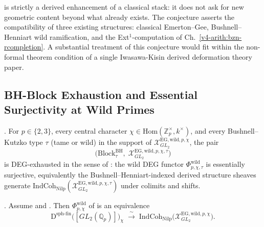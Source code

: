 \begin{remark}
\label{v4-arith:deg-f1a:rem:wild-EG-domain}
 is strictly a
derived enhancement of a classical stack: it does not ask for new
geometric content beyond what already exists. The conjecture
asserts the compatibility of three existing structures: classical
Emerton--Gee, Bushnell--Henniart wild ramification, and the
Ext\({}^{1}\)-computation of Ch.~\ref{v4-arith:bzn-rcompletion}. A
substantial treatment of this conjecture would fit within the
non-formal theorem condition of a single Iwasawa-Kisin derived deformation
theory paper.
\end{remark}

\subsection{BH-Block Exhaustion and Essential Surjectivity at Wild Primes}

\begin{conjecture}
\label{v4-arith:deg-f1a:conj:BH-block-exhaustion}
\ClaimStatusConjectured. For \(p\in\{2,3\}\), every central character
\(\chi\in\mathrm{Hom}(\mathbb{Z}_{p}^{\times},k^{\times})\), and every
Bushnell--Kutzko type \(\tau\) (tame or wild) in the support of
\(\mathcal{X}^{\mathrm{EG,wild},p,\chi}_{GL_{2}}\), the pair
\[
\bigl(\mathrm{Block}^{\mathrm{BH}}_{\tau},\;\mathcal{X}^{\mathrm{EG,wild},p,\chi,\tau}_{GL_{2}}\bigr)
\]
is DEG-exhausted in the sense of :
the wild DEG functor \(\Phi^{\mathrm{wild}}_{p,\chi,\tau}\) is essentially
surjective, equivalently the Bushnell--Henniart-indexed derived structure
sheaves generate \(\mathrm{IndCoh}_{\mathrm{Nilp}}(\mathcal{X}^{\mathrm{EG,wild},p,\chi,\tau}_{GL_{2}})\)
under colimits and shifts.
\end{conjecture}

\begin{corollary}
\label{v4-arith:deg-f1a:cor:wild-ess-surj}
\ClaimStatusProvedHereConditional. Assume
 and
. Then
\(\Phi^{\mathrm{wild}}_{p,\chi}\) of
 is an equivalence
\begin{equation}
\mathrm{D}^{\mathrm{sph\text{-}fin}}\bigl([GL_{2}(\mathbb{Q}_{p})]\bigr)_{\chi}
\;\xrightarrow{\;\sim\;}\;\mathrm{IndCoh}_{\mathrm{Nilp}}\bigl(\mathcal{X}^{\mathrm{EG,wild},p,\chi}_{GL_{2}}\bigr).
\end{equation}
\end{corollary}

